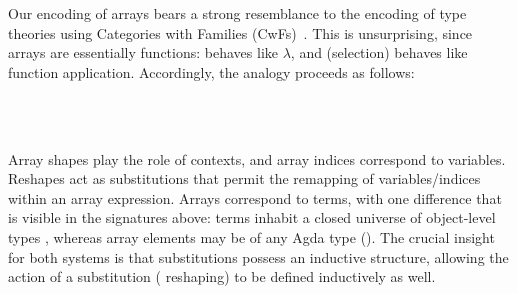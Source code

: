 Our encoding of arrays bears a strong resemblance to the encoding of type
theories using Categories with Families (CwFs)~\citep{Castellan2021}.  This is
unsurprising, since arrays are essentially functions:  behaves like
$\lambda$, and \AF{\_[\_]} (selection) behaves like function application.
Accordingly, the analogy proceeds as follows:
\begin{code}[hide]%
\>[0]\<%
\\
\>[0][@{}l@{\AgdaIndent{0}}]%
\>[2]%
\>[7]\AgdaSymbol{:}\AgdaSpace{}%
\<%
\\
\>[0]\<%
\end{code}

Array shapes play the role of contexts, and array indices correspond to
variables.  Reshapes act as substitutions that permit the remapping of
variables/indices within an array expression.  Arrays correspond to terms,
with one difference that is visible in the signatures above: terms inhabit a
closed universe of object-level types , whereas array elements may be
of any Agda type ().  The crucial insight for both systems is that substitutions
possess an inductive structure, allowing the action of a substitution (\ie{}
reshaping) to be defined inductively as well.

